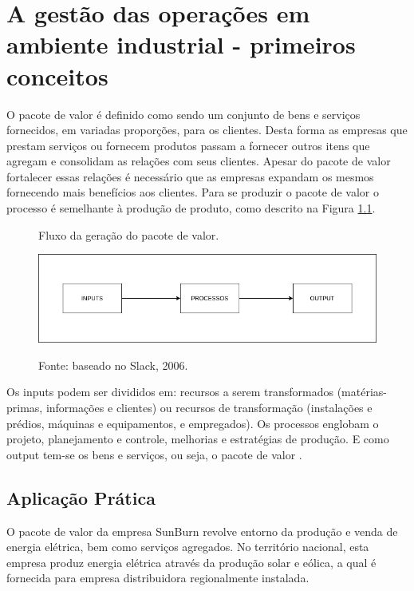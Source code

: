 \chapter{A gestão das operações em ambiente industrial - primeiros conceitos}
\label{chap:gestao_operacoes}

O pacote de valor é definido como sendo um conjunto de bens e serviços fornecidos, em variadas proporções, para os clientes. Desta forma as empresas que prestam serviços ou fornecem produtos passam a fornecer outros itens que agregam e consolidam as relações com seus clientes.
Apesar do pacote de valor fortalecer essas relações é necessário que as empresas expandam os mesmos fornecendo mais benefícios aos clientes.
Para se produzir o pacote de valor o processo é semelhante à produção de produto, como descrito na Figura \ref{fig:pacotevalor}.

\begin{figure}[H]
    \caption{Fluxo da geração do pacote de valor.}
    \includegraphics[width=\textwidth]{images/pacote_valor.png}
    \label{fig:pacotevalor}
    \caption*{Fonte: baseado no Slack, 2006.}

\end{figure}

Os inputs podem ser divididos em: recursos a serem transformados (matérias-primas, informações e clientes) ou recursos de transformação (instalações e prédios, máquinas e equipamentos, e empregados). Os processos englobam o projeto, planejamento e controle, melhorias e estratégias de produção. E como output tem-se os bens e serviços, ou seja, o pacote de valor \cite{slack2006administraccao}.
\section{Aplicação Prática}
\label{sec:gestao_operacoes_aplicacao}
O pacote de valor da empresa SunBurn revolve entorno da produção e venda de energia elétrica, bem como serviços agregados. No território nacional, esta empresa produz energia elétrica através da produção solar e eólica, a qual é fornecida para empresa distribuidora regionalmente instalada. 

